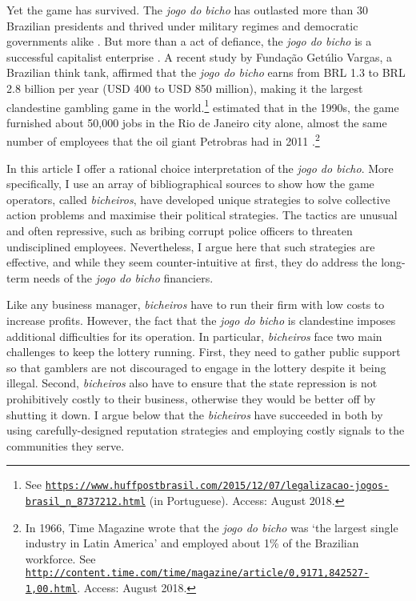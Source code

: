 \documentclass[a4paper,12pt]{article}
\begin{document}
Yet the game has survived. The \textit{jogo do bicho} has outlasted more than 30 Brazilian presidents and thrived under military regimes and democratic governments alike \citep{jupiara2015poroes}. But more than a act of defiance, the \textit{jogo do bicho} is a successful capitalist enterprise \citep{labronici2014sorteio, magalhaes2005ganhou}. A recent study by Fundação Getúlio Vargas, a Brazilian think tank, affirmed that the \textit{jogo do bicho} earns from BRL 1.3 to BRL 2.8 billion per year (USD 400 to USD 850 million), making it the largest clandestine gambling game in the world.\footnote{See \href{https://www.huffpostbrasil.com/2015/12/07/legalizacao-jogos-brasil_n_8737212.html}{\texttt{https://www.huffpostbrasil.com/2015/12/07/legalizacao-jogos-brasil\_n\_8737212.html}} (in Portuguese). Access: August 2018.} \citet[171]{schneider1996brazil} estimated that in the 1990s, the game furnished about 50,000 jobs in the Rio de Janeiro city alone, almost the same number of employees that the oil giant Petrobras had in 2011 \citep{exame2013petrobras}.\footnote{In 1966, Time Magazine wrote that the \textit{jogo do bicho} was `the largest single industry in Latin America' and employed about 1\% of the Brazilian workforce. See \href{http://content.time.com/time/magazine/article/0,9171,842527-1,00.html}{\texttt{http://content.time.com/time/magazine/article/0,9171,842527-1,00.html}}. Access: August 2018.}

In this article I offer a rational choice interpretation of the \textit{jogo do bicho}. More specifically, I use an array of bibliographical sources to show how the game operators, called \textit{bicheiros}, have developed unique strategies to solve collective action problems and maximise their political strategies. The tactics are unusual and often repressive, such as bribing corrupt police officers to threaten undisciplined employees. Nevertheless, I argue here that such strategies are effective, and while they seem counter-intuitive at first, they do address the long-term needs of the \textit{jogo do bicho} financiers. 

Like any business manager, \textit{bicheiros} have to run their firm with low costs to increase profits. However, the fact that the \textit{jogo do bicho} is clandestine imposes additional difficulties for its operation. In particular,  \textit{bicheiros} face two main challenges to keep the lottery running. First, they need to gather public support so that gamblers are not discouraged to engage in the lottery despite it being illegal. Second, \textit{bicheiros} also have to ensure that the state repression is not prohibitively costly to their business, otherwise they would be better off by shutting it down. I argue below that the \textit{bicheiros} have succeeded in both by using carefully-designed reputation strategies and employing costly signals to the communities they serve. 
\end{document}
